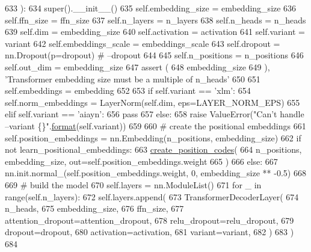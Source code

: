 \begin{DoxyCode}
633     ):
634         super().\_\_init\_\_()
635         self.embedding\_size = embedding\_size
636         self.ffn\_size = ffn\_size
637         self.n\_layers = n\_layers
638         self.n\_heads = n\_heads
639         self.dim = embedding\_size
640         self.activation = activation
641         self.variant = variant
642         self.embeddings\_scale = embeddings\_scale
643         self.dropout = nn.Dropout(p=dropout)  \textcolor{comment}{# --dropout}
644 
645         self.n\_positions = n\_positions
646         self.out\_dim = embedding\_size
647         \textcolor{keyword}{assert} (
648             embedding\_size %
649         ), \textcolor{stringliteral}{'Transformer embedding size must be a multiple of n\_heads'}
650 
651         self.embeddings = embedding
652 
653         \textcolor{keywordflow}{if} self.variant == \textcolor{stringliteral}{'xlm'}:
654             self.norm\_embeddings = LayerNorm(self.dim, eps=LAYER\_NORM\_EPS)
655         \textcolor{keywordflow}{elif} self.variant == \textcolor{stringliteral}{'aiayn'}:
656             \textcolor{keywordflow}{pass}
657         \textcolor{keywordflow}{else}:
658             \textcolor{keywordflow}{raise} ValueError(\textcolor{stringliteral}{"Can't handle --variant \{\}"}.\hyperlink{namespaceparlai_1_1chat__service_1_1services_1_1messenger_1_1shared__utils_a32e2e2022b824fbaf80c747160b52a76}{format}(self.variant))
659 
660         \textcolor{comment}{# create the positional embeddings}
661         self.position\_embeddings = nn.Embedding(n\_positions, embedding\_size)
662         \textcolor{keywordflow}{if} \textcolor{keywordflow}{not} learn\_positional\_embeddings:
663             \hyperlink{namespaceparlai_1_1agents_1_1transformer_1_1modules_a0b86437e6e9682fa3100e9cadcaae259}{create\_position\_codes}(
664                 n\_positions, embedding\_size, out=self.position\_embeddings.weight
665             )
666         \textcolor{keywordflow}{else}:
667             nn.init.normal\_(self.position\_embeddings.weight, 0, embedding\_size ** -0.5)
668 
669         \textcolor{comment}{# build the model}
670         self.layers = nn.ModuleList()
671         \textcolor{keywordflow}{for} \_ \textcolor{keywordflow}{in} range(self.n\_layers):
672             self.layers.append(
673                 TransformerDecoderLayer(
674                     n\_heads,
675                     embedding\_size,
676                     ffn\_size,
677                     attention\_dropout=attention\_dropout,
678                     relu\_dropout=relu\_dropout,
679                     dropout=dropout,
680                     activation=activation,
681                     variant=variant,
682                 )
683             )
684 
\end{DoxyCode}



